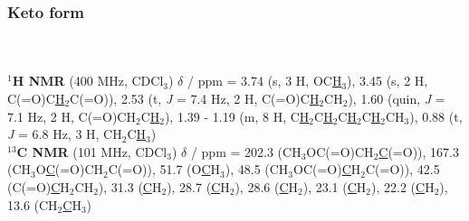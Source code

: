 \subsubsection*{Keto form }%
\\[1\baselineskip]
\\[1\baselineskip]
\textbf{$^{1}$H NMR} (400 MHz, CDCl$_3$) $\delta$ / ppm = 
	3.74 (s, 3 H, OC\underline{H}$_3$), 
	3.45 (s, 2 H, C(=O)C\underline{H}$_2$C(=O)), 
	2.53 (t, \textit{J} = 7.4 Hz, 2 H, C(=O)C\underline{H}$_2$CH$_2$), 
	1.60 (quin, \textit{J} = 7.1 Hz, 2 H, C(=O)CH$_2$C\underline{H}$_2$),
	1.39 - 1.19 (m, 8 H, C\underline{H}$_2$C\underline{H}$_2$C\underline{H}$_2$C\underline{H}$_2$CH$_3$), 
	0.88 (t, \textit{J} = 6.8 Hz, 3 H, CH$_2$C\underline{H}$_3$)
\\[1\baselineskip]
\textbf{$^{13}$C NMR} (101 MHz, CDCl$_3$) $\delta$ / ppm = 
	202.3 (CH$_3$OC(=O)CH$_2$\underline{C}(=O)), 
	167.3 (CH$_3$O\underline{C}(=O)CH$_2$C(=O)),
	51.7 (O\underline{C}H$_3$), 
	48.5 (CH$_3$OC(=O)\underline{C}H$_2$C(=O)), 
	42.5 (C(=O)\underline{C}H$_2$CH$_2$), 
	31.3 (\underline{C}H$_2$), 
	28.7 (\underline{C}H$_2$), 
	28.6 (\underline{C}H$_2$), 
	23.1 (\underline{C}H$_2$), 
	22.2 (\underline{C}H$_2$), 
	13.6 (CH$_2$\underline{C}H$_3$)

